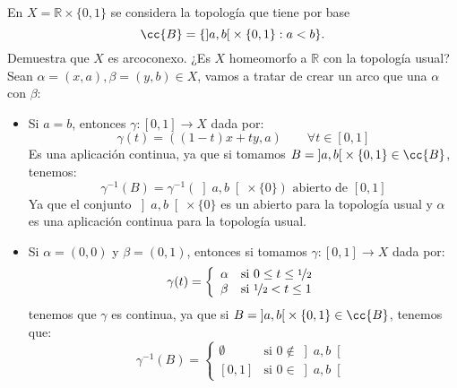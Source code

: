 \begin{ejercicio}
    En $X=\mathbb{R}\times \{0,1\}$ se considera la topología que tiene por base
    \begin{equation*}
        \cc{B} = \{\left]a,b\right[\times \{0,1\} : a<b\}.
    \end{equation*}
    Demuestra que $X$ es arcoconexo. ¿Es $X$ homeomorfo a $\mathbb{R}$ con la topología usual?\\

    \noindent
    Sean $\alpha=(x,a),\beta=(y,b)\in X$, vamos a tratar de crear un arco que una $\alpha$ con $\beta$:
    \begin{itemize}
        \item Si $a=b$, entonces $\gamma:[0,1]\to X$ dada por:
            \begin{equation*}
                \gamma(t) = ((1-t)x + ty, a) \qquad \forall t\in [0,1]
            \end{equation*}
            Es una aplicación continua, ya que si tomamos $B = \left]a,b\right[\times \{0,1\}\in \cc{B}$, tenemos:
            \begin{equation*}
                \gamma^{-1}(B) = \gamma^{-1}(\left]a,b\right[\times \{0\}) \text{\ abierto de\ } [0,1]
            \end{equation*}
            Ya que el conjunto $\left]a,b\right[\times \{0\}$ es un abierto para la topología usual y $\alpha$ es una aplicación continua para la topología usual.
        \item Si $\alpha = (0,0)$ y $\beta = (0,1)$, entonces si tomamos $\gamma:[0,1]\to X$ dada por:
            \begin{equation*}
                \gamma(t) = \left\{\begin{array}{ll}
                        \alpha & \text{si\ } 0 \leq t \leq \nicefrac{1}{2}\\
                        \beta & \text{si\ } \nicefrac{1}{2}<t \leq 1
                \end{array}\right.
            \end{equation*}
            tenemos que $\gamma$ es continua, ya que si $B = \left]a,b\right[\times \{0,1\}\in \cc{B}$, tenemos que:
            \begin{equation*}
                \gamma^{-1}(B) = \left\{\begin{array}{cl}
                        \emptyset & \text{si\ } 0 \notin \left]a,b\right[ \\
                        \left[0,1\right] & \text{si\ } 0 \in \left]a,b\right[

\end{array}
\end{equation*}
\end{itemize}
\end{ejercicio}
